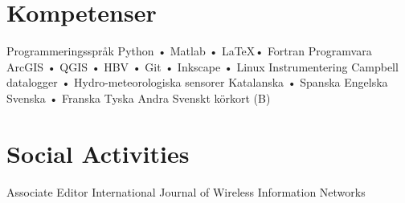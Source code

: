\ifswedish
    \section{Kompetenser}
        \skill
            {Programmeringsspråk}
            {Python • Matlab • \LaTeX • Fortran}
        \skill
            {Programvara}
            {ArcGIS • QGIS • HBV • Git • Inkscape • Linux}
        \skill
            {Instrumentering}
            {Campbell datalogger • Hydro-meteorologiska sensorer}
        \languages
            {Katalanska • Spanska}
            {Engelska}
            {Svenska • Franska}
            {Tyska}
        \skill
            {Andra}
            {Svenskt körkort (B)}
\else
    \section{Social Activities}
        \skill
            {Associate Editor}
            {International Journal of Wireless Information Networks}
\fi
